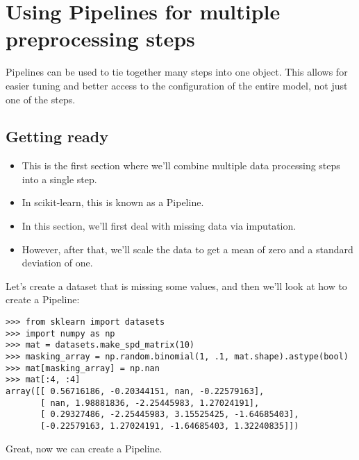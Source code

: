 \documentclass[SKL-MASTER.tex]{subfiles}
\begin{document}
\Large
\section*{Using Pipelines for multiple preprocessing steps}
Pipelines can be used to tie together many steps into one object. This allows for easier tuning
and better access to the configuration of the entire model, not just one of the steps.
\subsection*{Getting ready}
\begin{itemize}
\item This is the first section where we'll combine multiple data processing steps into a single step.
\item In scikit-learn, this is known as a Pipeline. 
\item In this section, we'll first deal with missing data
via imputation. \item However, after that, we'll scale the data to get a mean of zero and a standard
deviation of one.
\end{itemize}
Let's create a dataset that is missing some values, and then we'll look at how to create
a Pipeline:
\begin{framed}
\begin{verbatim}
>>> from sklearn import datasets
>>> import numpy as np
>>> mat = datasets.make_spd_matrix(10)
>>> masking_array = np.random.binomial(1, .1, mat.shape).astype(bool)
>>> mat[masking_array] = np.nan
>>> mat[:4, :4]
array([[ 0.56716186, -0.20344151, nan, -0.22579163],
       [ nan, 1.98881836, -2.25445983, 1.27024191],
       [ 0.29327486, -2.25445983, 3.15525425, -1.64685403],
       [-0.22579163, 1.27024191, -1.64685403, 1.32240835]])
\end{verbatim}
\end{framed}
Great, now we can create a Pipeline.
\end{document}
